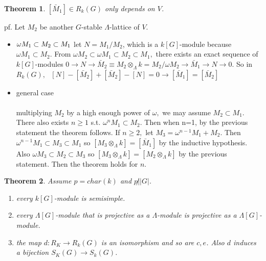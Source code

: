 \documentclass[12pt,letterpaper]{report}
\newtheorem{theorem}{Theorem}[section]
\begin{document}
\begin{theorem}$[\bar{M}_{1}]\in R_{k}(G)$ only depends on $V$.\end{theorem}
pf. Let $M_{2}$ be another $G$-stable $\Lambda$-lattice of $V$. 
\begin{itemize}
\item $\omega M_{1}\subset M_{2}\subset M_{1}
\\\\$ let $N=M_{1}/M_{2}$, which is a $k[G]$-module because $\omega M_{1}\subset M_{2}$. From $\omega M_{2}\subset \omega M_{1}\subset M_{2}\subset M_{1},$ there exists an exact sequence of $k[G]$-modules $0\rightarrow N\rightarrow \bar{M}_{2}\equiv M_{2}\otimes_{\Lambda}k=M_{2}/\omega M_{2}\rightarrow\bar{M}_{1}\rightarrow N\rightarrow0$. So in $R_{k}(G),\,\,\,\,[N]-[\bar{M}_{2}]+[\bar{M}_{2}]-[N]=0\rightarrow [\bar{M}_{1}]=[\bar{M}_{2}]$
\item general case
\\\\ multiplying $M_{2}$ by a high enough power of $\omega,$ we may assume $M_{2}\subset M_{1}$. There also exists $n\geq1$ s.t. $\omega^{n}M_{1}\subset M_{2}$. Then when n=1, by the previous statement the theorem follows. If $n\geq2,$ let $M_{3}=\omega^{n-1}M_{1}+M_{2}$. Then $\omega^{n-1}M_{1}\subset M_{3}\subset M_{1}$ so $[M_{3}\otimes_{\Lambda}k]=[\bar{M}_{1}]$ by the inductive hypothesis. Also $\omega M_{3}\subset M_{2}\subset M_{3}$ so $[M_{3}\otimes_{\Lambda}k]=[M_{2}\otimes_{\Lambda}k]$ by the previous statement. Then the theorem holds for $n$.

\end{itemize}
\begin{theorem}Assume $p= char(k)$ and $p\not| |G|$.\begin{enumerate}\item every $k[G]$-module is semisimple.\item every $\Lambda[G]$-module that is projective as a $\Lambda$-module is projective as a $\Lambda[G]$-module.\item the map $d:R_{K}\rightarrow R_{k}(G)$ is an isomorphism and so are $c,e$. Also $d$ induces a bijection $S_{K}(G)\rightarrow S_{k}(G)$. \end{enumerate}\end{theorem}
\end{document}
